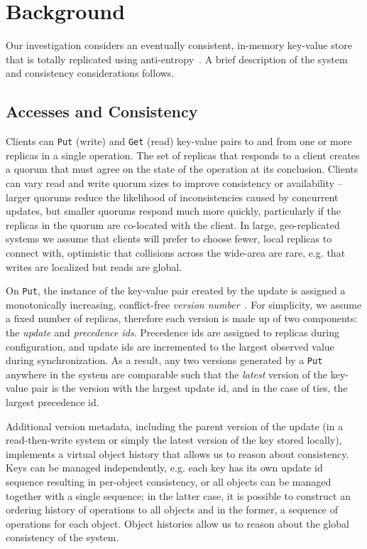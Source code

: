\section{Background}

Our investigation considers an eventually consistent, in-memory key-value
store that is totally replicated using
anti-entropy~\cite{dynamo}.
A brief description of the system and consistency considerations follows.

\subsection{Accesses and Consistency}

Clients can \texttt{Put} (write) and \texttt{Get} (read) key-value pairs to
 and from one or more replicas in a single operation.
The set of replicas that responds to a client creates a quorum that must
agree on the state of the operation at its conclusion.
Clients can vary read and write quorum sizes to improve consistency or
availability -- larger quorums reduce the likelihood of inconsistencies
caused by concurrent updates, but smaller quorums respond much more quickly,
particularly if the replicas in the quorum are co-located with the client.
In large, geo-replicated systems we assume that clients will prefer to choose
fewer, local replicas to connect with, optimistic that collisions across the
wide-area are rare, e.g. that writes are localized but reads are global.

On \texttt{Put}, the instance of the key-value pair created by the update is
assigned a monotonically increasing, conflict-free \textit{version
number}~\cite{version_conflict_detection,version_vectors}.
For simplicity, we assume a fixed number of replicas, therefore each version
is made up of two components: the \textit{update} and \textit{precedence ids}.
Precedence ids are assigned to replicas during configuration, and update ids
are incremented to the largest observed value during synchronization.
As a result, any two versions generated by a \texttt{Put} anywhere in the
system are comparable such that the \textit{latest} version of the key-value
pair is the version with the largest update id, and in the case of ties, the
largest precedence id.

Additional version metadata, including the parent version of the update (in a
read-then-write system or simply the latest version of the key stored
locally), implements a virtual object history that allows us to reason about
consistency.
Keys can be managed independently, e.g. each key has its own update id
sequence resulting in per-object consistency, or all objects can be managed
together with a single sequence; in the latter case, it is possible to
construct an ordering history of operations to all objects and in the former,
a sequence of operations for each object.
Object histories allow us to reason about the global consistency of the
system.

